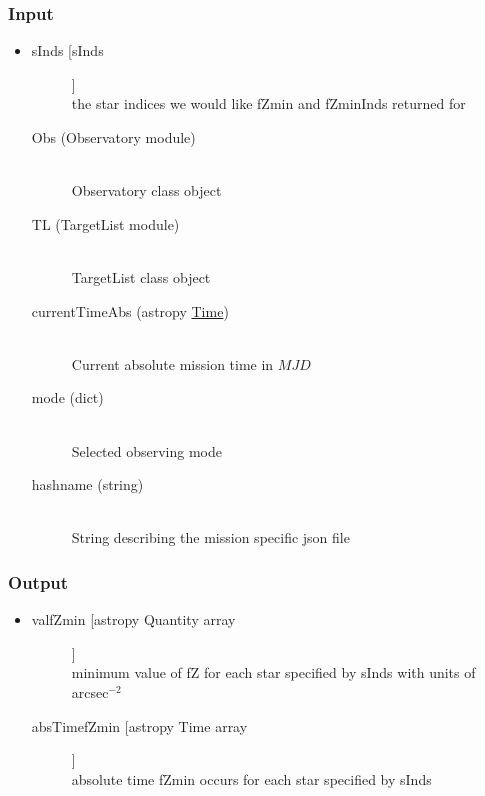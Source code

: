 \documentclass[cleanfoot]{asme2ej}
\begin{document}
\subsubsection*{Input}
\begin{itemize}
\item
\begin{description}
    \item[sInds [sInds]] \hfill \\ the star indices we would like fZmin and fZminInds returned for
    \item[Obs (Observatory module)] \hfill \\ Observatory class object
    \item[TL (TargetList module)] \hfill \\ TargetList class object
    \item[currentTimeAbs (astropy \href{http://astropy.readthedocs.org/en/latest/time/index.html}{Time})] \hfill \\ Current absolute mission time in $ MJD $
    \item[mode (dict)] \hfill \\ Selected observing mode
    \item[hashname (string)] \hfill \\ String describing the mission specific json file
\end{description}
\end{itemize}
\subsubsection*{Output}
\begin{itemize}
\item
\begin{description}
    \item[valfZmin [astropy Quantity array]] \hfill \\ minimum value of fZ for each star specified by sInds with units of arcsec$^{-2}$
    \item[absTimefZmin [astropy Time array]] \hfill \\ absolute time fZmin occurs for each star specified by sInds
\end{description}
\end{itemize}


\end{document}
